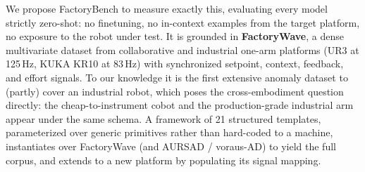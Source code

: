 We propose FactoryBench to measure exactly this, evaluating every model strictly zero-shot: no finetuning, no in-context examples from the target platform, no exposure to the robot under test. It is grounded in \textbf{FactoryWave}, a dense multivariate dataset from collaborative and industrial one-arm platforms (UR3 at 125\,Hz, KUKA KR10 at 83\,Hz) with synchronized setpoint, context, feedback, and effort signals. To our knowledge it is the first extensive anomaly dataset to (partly) cover an industrial robot, which poses the cross-embodiment question directly: the cheap-to-instrument cobot and the production-grade industrial arm appear under the same schema. A framework of 21 structured templates, parameterized over generic primitives rather than hard-coded to a machine, instantiates over FactoryWave (and AURSAD / voraus-AD) to yield the full corpus, and extends to a new platform by populating its signal mapping.

\newcommand{\workshoprelatedworknote}{Generalist robot policies and robot foundation models are typically evaluated on task success under visuomotor control; FactoryBench is complementary, holding the platform fixed and asking what a model understands about a machine it has never seen, from the controller and sensor signals that any deployed system already emits, which is the modality available in industrial settings where cameras and teleoperation demonstrations are not.}

\newcommand{\workshopclosingnote}{Zero-shot deployment onto unseen hardware is not yet reliable: models transfer some competence to a machine they have never seen, but not enough for an operator to act on it, at the level that matters most.}


